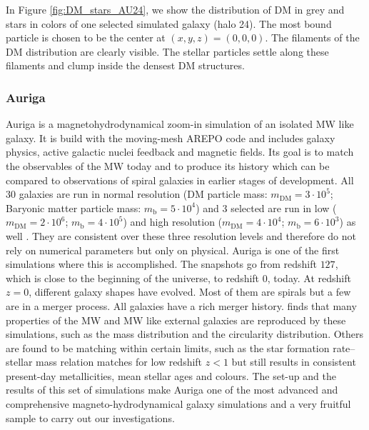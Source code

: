 In Figure \ref{fig:DM_stars_AU24}, we show the distribution of \ac{DM} in grey and stars in colors of one selected simulated galaxy (halo 24). The most bound particle is chosen to be the center at $(x,y,z) = (0,0,0)$. The filaments of the \ac{DM} distribution are clearly visible. The stellar particles settle along these filaments and clump inside the densest \ac{DM} structures. 

\subsubsection{Auriga}\label{subsubsec:auriga_intro}
Auriga is a magnetohydrodynamical zoom-in simulation of an isolated \ac{MW} like galaxy. It is build with the moving-mesh AREPO \citep{AREPO} code and includes galaxy physics, active galactic nuclei feedback and magnetic fields. Its goal is to match the observables of the \ac{MW} today and to produce its history which can be compared to observations of spiral galaxies in earlier stages of development. All 30 galaxies are run in normal resolution (\ac{DM} particle mass: $m_\mathrm{DM} = 3\cdot10^5$; Baryonic matter particle mass: $m_\mathrm{b} = 5\cdot10^4$) and 3 selected are run in low ($m_\mathrm{DM} = 2\cdot10^6$; $m_\mathrm{b} = 4\cdot10^5$) and high resolution ($m_\mathrm{DM} = 4\cdot10^4$; $m_\mathrm{b} = 6\cdot10^3$) as well \citep{AurigaGrand}. They are consistent over these three resolution levels and therefore do not rely on numerical parameters but only on physical. Auriga is one of the first simulations where this is accomplished. The snapshots go from redshift $127$, which is close to the beginning of the universe, to redshift $0$, today.  At redshift $z= 0$, different galaxy shapes have evolved. Most of them are spirals but a few are in a merger process. All galaxies have a rich merger history. \citet{AurigaGrand} finds that many properties of the \ac{MW} and \ac{MW} like external galaxies are reproduced by these simulations, such as the mass distribution and the circularity distribution. Others are found to be matching within certain limits, such as the star formation rate–stellar mass relation matches for low redshift $z<1$ but still results in consistent present-day metallicities, mean stellar ages and colours. The set-up and the results of this set of simulations make Auriga one of the most advanced and comprehensive magneto-hydrodynamical galaxy simulations and a very fruitful sample to carry out our investigations. \\
